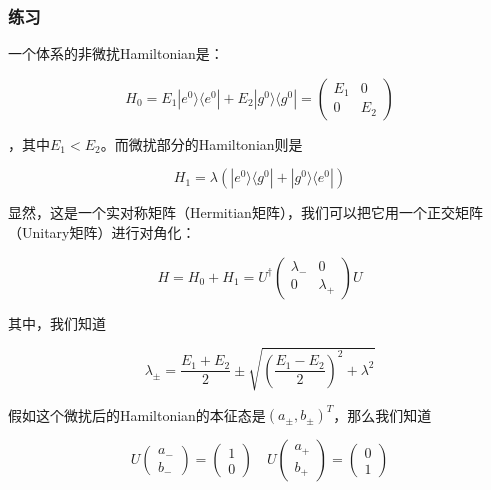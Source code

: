 \subsubsection{练习}
一个体系的非微扰Hamiltonian是：

\begin{equation}
H_0 = E_1|e^0\rangle\langle e^0| + E_2|g^0\rangle\langle g^0| =  \left(\begin{matrix} E_1 & 0\\ 0 & E_2\end{matrix}\right)
\end{equation}

，其中$E_1<E_2$。而微扰部分的Hamiltonian则是

\begin{equation}
H_1 = \lambda(|e^0\rangle\langle g^0|+|g^0\rangle\langle e^0|)
\end{equation}

显然，这是一个实对称矩阵（Hermitian矩阵），我们可以把它用一个正交矩阵（Unitary矩阵）进行对角化：

\begin{equation}
H = H_0+H_1 = U^\dagger\left(\begin{matrix} \lambda_- & 0\\0 & \lambda_+\end{matrix}\right)U
\end{equation}

其中，我们知道

\begin{equation}
\lambda_{\pm} = \frac{E_1+E_2}{2} \pm \sqrt{\left( \frac{E_1-E_2}{2}\right)^2 + \lambda^2}
\end{equation}

假如这个微扰后的Hamiltonian的本征态是$(a_\pm,b_\pm)^T$，那么我们知道

\begin{equation}
U\left(\begin{matrix}a_-\\b_-\end{matrix}\right) = \left(\begin{matrix}1\\0\end{matrix}\right)\quad U\left(\begin{matrix}a_+\\b_+\end{matrix}\right) = \left(\begin{matrix}0\\1\end{matrix}\right)
\end{equation}

